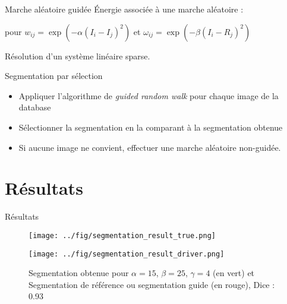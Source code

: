 \documentclass{beamer}
\begin{document}
\begin{frame}{Marche aléatoire guidée}
Énergie associée à une marche aléatoire  :

pour $w_{ij} = \exp(-\alpha(I_i-I_j)^2)$ et $\omega_{ij} = \exp(-\beta(I_i-R_j)^2)$

Résolution d'un système linéaire sparse.
\end{frame}


\begin{frame}{Segmentation par sélection}
\begin{itemize}
\item Appliquer l'algorithme de \textit{guided random walk} pour chaque image de la database
\item Sélectionner la segmentation en la comparant à la segmentation obtenue
\item Si aucune image ne convient, effectuer une marche aléatoire non-guidée.
\end{itemize}
\end{frame}


\section{Résultats}
\begin{frame}{Résultats}
  \begin{figure}[h]
    \begin{center}
      \parbox{5cm}{\texttt{[image: ../fig/segmentation\_result\_true.png]}}
      \parbox{5cm}{\texttt{[image: ../fig/segmentation\_result\_driver.png]}}
      \caption{Segmentation obtenue pour $\alpha=15$, $\beta=25$, $\gamma=4$ (en vert) et Segmentation de référence ou segmentation guide (en rouge), Dice : 0.93}
    \end{center}
  \end{figure}
\end{frame}

\end{document}
